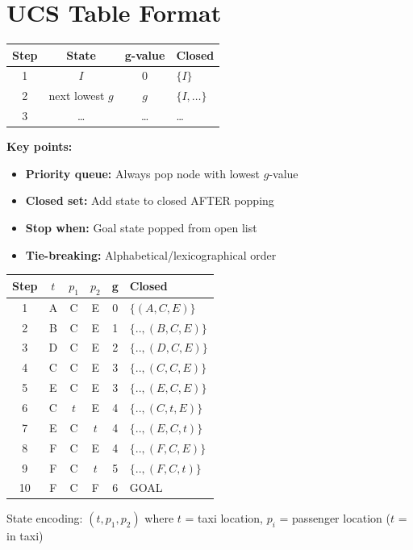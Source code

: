 \documentclass[11pt,a4paper]{article}
\begin{document}
\section{UCS Table Format}

\begin{definitionbox}
\begin{center}
\begin{tabular}{|c|c|c|l|}
\hline
\textbf{Step} & \textbf{State} & \textbf{g-value} & \textbf{Closed} \\
\hline
1 & $I$ & 0 & $\{I\}$ \\
2 & next lowest $g$ & $g$ & $\{I, \ldots\}$ \\
3 & \ldots & \ldots & \ldots \\
\hline
\end{tabular}
\end{center}

\textbf{Key points:}
\begin{itemize}[leftmargin=*,nosep]
\item \textbf{Priority queue:} Always pop node with lowest $g$-value
\item \textbf{Closed set:} Add state to closed AFTER popping
\item \textbf{Stop when:} Goal state popped from open list
\item \textbf{Tie-breaking:} Alphabetical/lexicographical order
\end{itemize}
\end{definitionbox}

\begin{examplebox}
\begin{center}
\begin{tabular}{|c|ccc|c|l|}
\hline
Step & $t$ & $p_1$ & $p_2$ & g & Closed \\
\hline
1 & A & C & E & 0 & $\{(A,C,E)\}$ \\
2 & B & C & E & 1 & $\{.., (B,C,E)\}$ \\
3 & D & C & E & 2 & $\{.., (D,C,E)\}$ \\
4 & C & C & E & 3 & $\{.., (C,C,E)\}$ \\
5 & E & C & E & 3 & $\{.., (E,C,E)\}$ \\
6 & C & $t$ & E & 4 & $\{.., (C,t,E)\}$ \\
7 & E & C & $t$ & 4 & $\{.., (E,C,t)\}$ \\
8 & F & C & E & 4 & $\{.., (F,C,E)\}$ \\
9 & F & C & $t$ & 5 & $\{.., (F,C,t)\}$ \\
10 & F & C & F & 6 & GOAL \\
\hline
\end{tabular}
\end{center}
State encoding: $(t, p_1, p_2)$ where $t$ = taxi location, $p_i$ = passenger location ($t$ = in taxi)
\end{examplebox}
\end{document}
